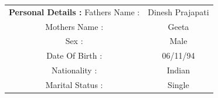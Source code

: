 \documentclass[a4paper]{article}
\begin{document}
\begin{flushleft}
\begin{tabular}{ cc }
\textbf {Personal Details :  }
 \hfill Fathers Name : & Dinesh Prajapati  \\ 
 \hfill Mothers Name : & Geeta \\  
 \hfill Sex : & Male   \\ 
 \hfill Date Of Birth : & 06/11/94  \\
 \hfill Nationality : & Indian  \\
 \hfill Marital Status : & Single
\end{tabular}
\end{flushleft}
\end{document}
